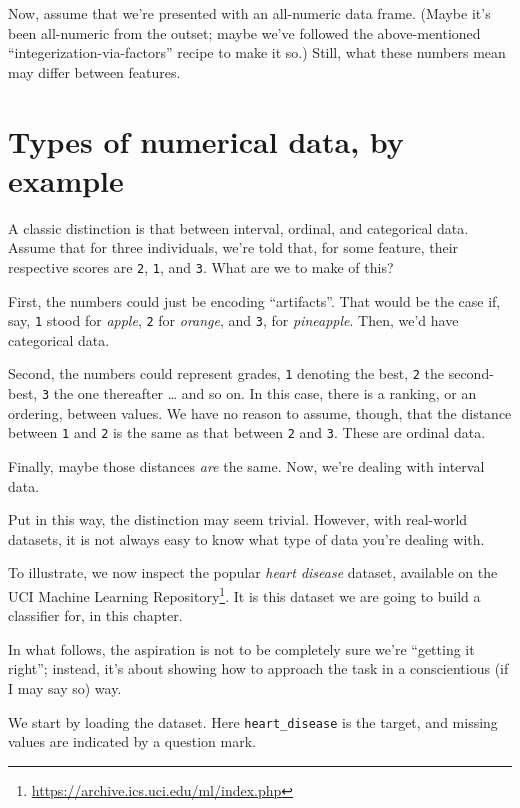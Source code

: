 \documentclass[
  letterpaper,
]{krantz}
\DeclareRobustCommand{\href}[2]{#2\footnote{\url{#1}}}
\begin{document}
Now, assume that we're presented with an all-numeric data frame. (Maybe
it's been all-numeric from the outset; maybe we've followed the
above-mentioned ``integerization-via-factors'' recipe to make it so.)
Still, what these numbers mean may differ between features.

\hypertarget{types-of-numerical-data-by-example}{%
\section{Types of numerical data, by
example}\label{types-of-numerical-data-by-example}}

A classic distinction is that between interval, ordinal, and categorical
data. Assume that for three individuals, we're told that, for some
feature, their respective scores are \texttt{2}, \texttt{1}, and
\texttt{3}. What are we to make of this?

First, the numbers could just be encoding ``artifacts''. That would be
the case if, say, \texttt{1} stood for \emph{apple}, \texttt{2} for
\emph{orange}, and \texttt{3}, for \emph{pineapple}. Then, we'd have
categorical data.

Second, the numbers could represent grades, \texttt{1} denoting the
best, \texttt{2} the second-best, \texttt{3} the one thereafter \ldots{}
and so on. In this case, there is a ranking, or an ordering, between
values. We have no reason to assume, though, that the distance between
\texttt{1} and \texttt{2} is the same as that between \texttt{2} and
\texttt{3}. These are ordinal data.

Finally, maybe those distances \emph{are} the same. Now, we're dealing
with interval data.

Put in this way, the distinction may seem trivial. However, with
real-world datasets, it is not always easy to know what type of data
you're dealing with.

To illustrate, we now inspect the popular \emph{heart disease} dataset,
available on the \href{https://archive.ics.uci.edu/ml/index.php}{UCI
Machine Learning Repository}. It is this dataset we are going to build a
classifier for, in this chapter.

In what follows, the aspiration is not to be completely sure we're
``getting it right''; instead, it's about showing how to approach the
task in a conscientious (if I may say so) way.

We start by loading the dataset. Here \texttt{heart\_disease} is the
target, and missing values are indicated by a question mark.
\end{document}
